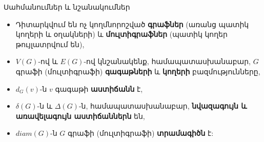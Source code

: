 \begin{frame}{Սահմանումներ և նշանակումներ}
\begin{itemize}
    \item Դիտարկվում են ոչ կողմնորոշված \textbf{գրաֆներ} (առանց պատիկ կողերի և օղակների) և \textbf{մուլտիգրաֆներ} (պատիկ կողեր թույլատրվում են),
    \item $V(G)$-ով և $E(G)$-ով կնշանակենք, համապատասխանաբար, $G$ գրաֆի (մուլտիգրաֆի) \textbf{գագաթների} և \textbf{կողերի} բազմությունները,
    \item $d_G(v)$-ն $v$ գագաթի \textbf{աստիճանն} է,
    \item $\delta(G)$-ն և $\Delta(G)$-ն, համապատասխանաբար, \textbf{նվազագույն և առավելագույն աստիճաններն} են,
    \item $diam(G)$-ն $G$ գրաֆի (մուլտիգրաֆի) \textbf{տրամագիծն} է:
\end{itemize} 
\end{frame}

